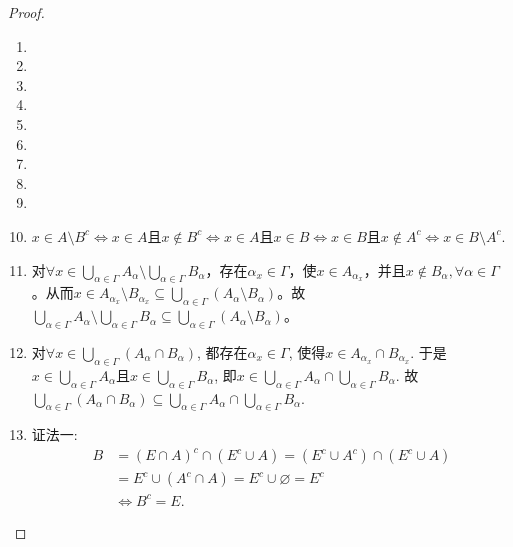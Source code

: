\documentclass[../../main.tex]{subfiles}%
\begin{document}
\begin{proof}
\begin{enumerate}[(1)]
\item 

\item 

\item 

\item 

\item 

\item 

\item 

\item 

\item 

\item $x\in A\setminus B^c\Longleftrightarrow x\in A\text{且}x\notin B^c\Longleftrightarrow x\in A\text{且}x\in B
\Longleftrightarrow x\in B\text{且}x\notin A^c\Longleftrightarrow x\in B\setminus A^c.$

\item 对\(\forall x \in \bigcup_{\alpha \in \Gamma} A_{\alpha} \setminus \bigcup_{\alpha \in \Gamma} B_{\alpha}\)，存在\(\alpha_x \in \Gamma\)，使\(x \in A_{\alpha_x}\)，并且\(x \notin B_{\alpha}, \forall \alpha \in \Gamma\)。从而\(x \in A_{\alpha_x} \setminus B_{\alpha_x} \subseteq \bigcup_{\alpha \in \Gamma} (A_{\alpha} \setminus B_{\alpha})\)。故\(\bigcup_{\alpha \in \Gamma} A_{\alpha} \setminus \bigcup_{\alpha \in \Gamma} B_{\alpha} \subseteq \bigcup_{\alpha \in \Gamma} (A_{\alpha} \setminus B_{\alpha})\)。

\item 对$\forall x\in \bigcup_{\alpha \in \Gamma}{\left( A_{\alpha}\cap B_{\alpha} \right)}$, 都存在$\alpha _x\in \Gamma$, 使得$x\in A_{\alpha _x}\cap B_{\alpha _x}$. 于是$x\in \bigcup_{\alpha \in \Gamma}{A_{\alpha}}$且$x\in \bigcup_{\alpha \in \Gamma}{B_{\alpha}}$, 即$x\in \bigcup_{\alpha \in \Gamma}{A_{\alpha}}\cap \bigcup_{\alpha \in \Gamma}{B_{\alpha}}$. 故$\bigcup_{\alpha \in \Gamma}{\left( A_{\alpha}\cap B_{\alpha} \right)}\subseteq \bigcup_{\alpha \in \Gamma}{A_{\alpha}}\cap \bigcup_{\alpha \in \Gamma}{B_{\alpha}}.$

\item {\color{blue}证法一:}
\begin{align*}
B&=(E\cap A)^c\cap (E^c\cup A)=(E^c\cup A^c)\cap (E^c\cup A)
\\
&=E^c\cup (A^c\cap A)=E^c\cup \varnothing =E^c
\\
&\Longleftrightarrow B^c=E.
\end{align*}


\end{enumerate}
\end{proof}
\end{document}
